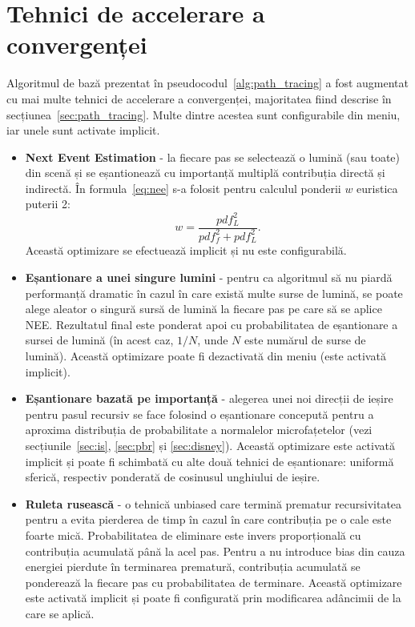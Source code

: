 \documentclass[12pt,a4paper]{report}
\numberwithin{equation}{section} %
\begin{document}
\section{Tehnici de accelerare a convergenței}
Algoritmul de bază prezentat în pseudocodul~\ref{alg:path_tracing} a fost
augmentat cu mai multe tehnici de accelerare a convergenței, majoritatea fiind
descrise în secțiunea~\ref{sec:path_tracing}. Multe dintre acestea sunt configurabile
din meniu, iar unele sunt activate implicit.
\begin{itemize}
	\item \textbf{Next Event Estimation} - la fiecare pas se selectează o lumină (sau toate)
	      din scenă și se eșantionează cu importanță multiplă contribuția directă și indirectă.
	      În formula~\ref{eq:nee} s-a folosit pentru calculul ponderii $w$ euristica puterii 2:
	      \begin{equation}
		      w = \dfrac{pdf_L^2}{pdf_f^2 + pdf_L^2}.
	      \end{equation}
	      Această optimizare se efectuează implicit și nu este configurabilă.
	\item \textbf{Eșantionare a unei singure lumini} - pentru ca algoritmul să nu piardă
	      performanță dramatic în cazul în care există multe surse de lumină, se poate alege
	      aleator o singură sursă de lumină la fiecare pas pe care să se aplice NEE. Rezultatul
	      final este ponderat apoi cu probabilitatea de eșantionare a sursei de lumină (în acest
	      caz, $1/N$, unde $N$ este numărul de surse de lumină). Această optimizare poate
	      fi dezactivată din meniu (este activată implicit).
	\item \textbf{Eșantionare bazată pe importanță} - alegerea unei noi direcții de ieșire
	      pentru pasul recursiv se face folosind o eșantionare concepută pentru a aproxima
	      distribuția de probabilitate a normalelor microfațetelor (vezi secțiunile~\ref{sec:is}, \ref{sec:pbr} și \ref{sec:disney}).
	      Această optimizare este activată implicit și poate fi schimbată cu alte două
	      tehnici de eșantionare: uniformă sferică, respectiv ponderată de cosinusul unghiului
	      de ieșire.
	\item \textbf{Ruleta rusească} - o tehnică unbiased care termină prematur
	      recursivitatea pentru a evita pierderea de timp în cazul în care contribuția pe o cale
	      este foarte mică. Probabilitatea de eliminare este invers proporțională cu
	      contribuția acumulată până la acel pas. Pentru a nu introduce bias din cauza
	      energiei pierdute în terminarea prematură, contribuția acumulată se
	      ponderează la fiecare pas cu probabilitatea de terminare.
	      Această optimizare este activată implicit și poate fi configurată
	      prin modificarea adâncimii de la care se aplică.
\end{itemize}
\end{document}

